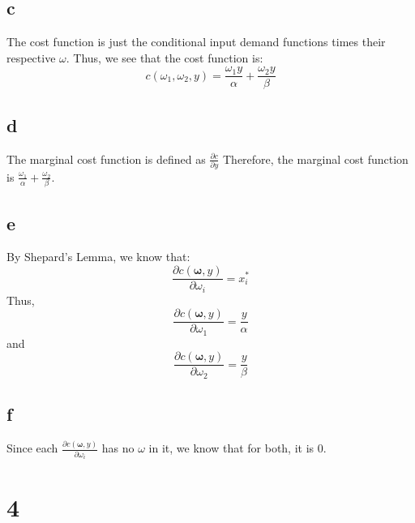\documentclass[11pt]{article}
\begin{document}
\subsection*{c}
The cost function is just the conditional input demand functions times their respective $\omega$. Thus, we see that the cost function is:
\[
c(\omega_1,\omega_2, y) = \frac{\omega_1 y}{\alpha} + \frac{\omega_2 y}{\beta}
\]
\subsection*{d}
The marginal cost function is defined as $\frac{\partial c}{\partial y}$ Therefore, the marginal cost function is $\frac{\omega_1}{\alpha} + \frac{\omega_2}{\beta}$.
\subsection*{e}
By Shepard's Lemma, we know that:
\[
\frac{\partial c(\mathbf{\omega}, y)}{\partial \omega_i} = x^*_i
\] 
Thus, 
\[
\frac{\partial c(\mathbf{\omega}, y)}{\partial \omega_1} = \frac{y}{\alpha}
\]
and 
\[
    \frac{\partial c(\mathbf{\omega}, y)}{\partial \omega_2} = \frac{y}{\beta}
\]
\subsection*{f}
Since each $\frac{\partial c(\mathbf{\omega}, y)}{\partial \omega_i}$ has no $\omega$ in it, we know that for both, it is 0.
\section*{4}
\end{document}
